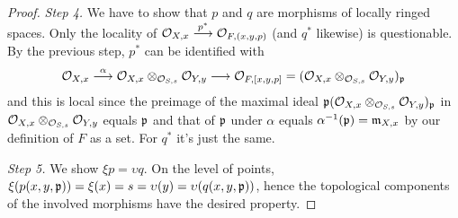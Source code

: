 \documentclass[a4paper,parskip=half,numbers=enddot, DIV=12]{scrreprt}
\begin{document}
\begin{proof}
    \emph{Step 4.} We have to show that $p$ and $q$ are morphisms of locally ringed spaces. Only the locality of $\Oo_{X,x}\morphism[p^*] \Oo_{F,(x,y,p)}$ (and $q^*$ likewise) is questionable. By the previous step, $p^*$ can be identified with 
    \begin{align*}
    	 \Oo_{X,x}\morphism[\alpha]\Oo_{X,x}\otimes_{\Oo_{S,s}}\Oo_{Y,y} \morphism \Oo_{F,[x,y,p]} = (\Oo_{X,x}\otimes_{\Oo_{S,s}}\Oo_{Y,y})_\pp
    \end{align*}
   and this is local since the preimage of the maximal ideal $\mathfrak{p} (\mathcal{O}_{X,x}\otimes_{\mathcal{O}_{S,s}}\mathcal{O}_{Y,y})_{\mathfrak{p}}$ in $\mathcal{O}_{X,x}\otimes_{\mathcal{O}_{S,s}}\mathcal{O}_{Y,y}$ equals $\mathfrak{p}$ and that of $\mathfrak{p}$ under $\alpha$ equals $\alpha^{-1}(\mathfrak{p})=\mathfrak{m}_{X,x}$ by our definition of $F$ as a set. For $q^*$ it's just the same.

\emph{Step 5.} We show $\xi p = \upsilon q$. On the level of points, $\xi(p(x,y,\mathfrak{p})) = \xi(x) = s = \upsilon(y) = \upsilon(q(x,y,\mathfrak{p}))$, hence the topological components of the involved morphisms have the desired property.


\end{proof}
\end{document}
